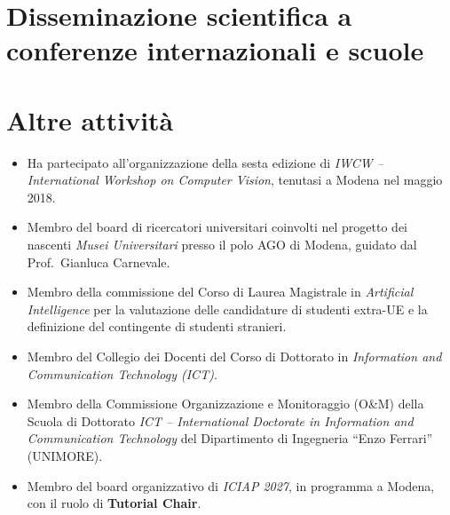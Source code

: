 \section{Disseminazione scientifica a conferenze internazionali e scuole}


\section{Altre attività}

\begin{itemize}
  \item Ha partecipato all’organizzazione della sesta edizione di \textit{IWCW -- International Workshop on Computer Vision}, tenutasi a Modena nel maggio 2018.
  \item Membro del board di ricercatori universitari coinvolti nel progetto dei nascenti \textit{Musei Universitari} presso il polo AGO di Modena, guidato dal Prof.~Gianluca Carnevale.
  \item Membro della commissione del Corso di Laurea Magistrale in \textit{Artificial Intelligence} per la valutazione delle candidature di studenti extra-UE e la definizione del contingente di studenti stranieri.
  \item Membro del Collegio dei Docenti del Corso di Dottorato in \textit{Information and Communication Technology (ICT)}.
  \item Membro della Commissione Organizzazione e Monitoraggio (O\&M) della Scuola di Dottorato \textit{ICT -- International Doctorate in Information and Communication Technology} del Dipartimento di Ingegneria “Enzo Ferrari” (UNIMORE).
  \item Membro del board organizzativo di \textit{ICIAP 2027}, in programma a Modena, con il ruolo di \textbf{Tutorial Chair}.
\end{itemize}
